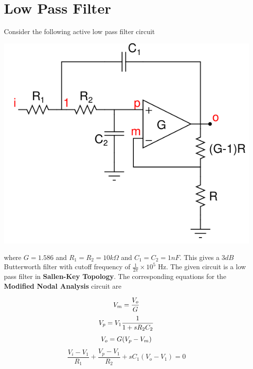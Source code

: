 \documentclass[12pt, a4paper]{report}
\begin{document}
\clearpage

\section*{Low Pass Filter}
Consider the following active low pass filter circuit
\begin{center}
	\includegraphics[scale=0.5]{Figure 1.png} 
	\label{fig:rawdata}
\end{center}
where $G = 1.586$ and $R_1 = R_2 = 10k\Omega$ and $C_1 = C_2 = 1nF$. This gives a $3dB$ Butterworth filter with cutoff frequency of $\frac{1}{2\pi} \times 10^5$ Hz. The given circuit is a low pass filter in \textbf{Sallen-Key Topology}. The corresponding equations for the \textbf{Modified Nodal Analysis} circuit are

\begin{equation}
V_m = \frac{V_o}{G}\\
\end{equation}
\begin{equation}
V_p = V_1 \frac{1}{1 + sR_2C_2}\\
\end{equation}
\begin{equation}
V_o = G(V_p - V_m)\\
\end{equation}
\begin{equation}
\frac{V_i - V_1}{R_1} + \frac{V_p - V_1}{R_2} + sC_1(V_o - V_1) = 0
\end{equation}
\end{document}
